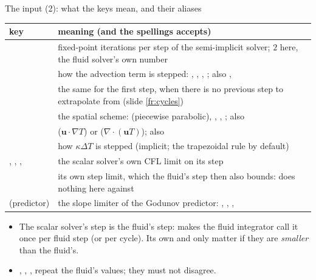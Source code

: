 \documentclass[aspectratio=169,11pt]{beamer}
\begin{document}
\begin{frame}{The input (2): what the keys mean, and their aliases}
\label{fr:keys}
\scriptsize
\setlength{\tabcolsep}{3pt}
\begin{tabular}{@{}L{0.26\textwidth}L{0.66\textwidth}@{}}
\toprule
key & meaning (and the spellings  accepts) \\
\midrule
{} & fixed-point iterations per step of the semi-implicit solver; $2$ here, the fluid solver's own number \\
\newline{} & how the advection term is stepped: , , , ; also ,  \\
\newline{} & the same for the first step, when there is no previous step to extrapolate from (slide \ref{fr:cycles}) \\
 & the spatial scheme:  (piecewise parabolic), , , ; also  \\
 &  ($\mathbf{u}\cdot\nabla T$) or  ($\nabla\cdot(\mathbf{u}T)$); also  \\
\newline{} & how $\kappa\Delta T$ is stepped (implicit; the trapezoidal rule by default) \\
, , ,  & the scalar solver's own CFL limit on its step \\
 & its own step limit, which the fluid's step then also bounds:  does nothing here against  \\
 (predictor) & the slope limiter of the Godunov predictor: , , ,  \\
\bottomrule
\end{tabular}

\medskip
\begin{itemize}
  \item The scalar solver's step is the fluid's step:  makes the fluid integrator call it once per fluid step (or per cycle). Its own  and  only matter if they are \emph{smaller} than the fluid's.
  \item {}, , ,  repeat the fluid's values; they must not disagree.
\end{itemize}
\end{frame}
\end{document}
